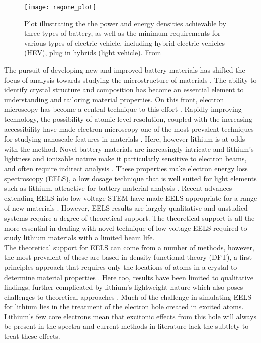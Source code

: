 \begin{figure}
	\centering
	\texttt{[image: ragone\_plot]}
	\caption{Plot illustrating the the power and energy densities achievable by three types of battery, as well as the minimum requirements for various types of electric vehicle, including hybrid electric vehicles (HEV), plug in hybrids (light vehicle). From \cite{etacheri_challenges_2011} }
	\label{ragone}
	
\end{figure}
The pursuit of developing new and improved battery materials has shifted the focus of analysis towards studying the microstructure of materials \cite{lu_lithium_2012,arthur_spontaneous_2016, muller_quantification_2018}. The ability to identify crystal structure and composition has become an essential element to understanding and tailoring material properties.  On this front, electron microscopy has become a central technique to this effort  \cite{chiu_aqueous_2013,inkson_2_2016}.  Rapidly improving technology, the possibility of atomic level resolution, coupled with the increasing accessibility have made electron microscopy one of the most prevalent techniques for studying nanoscale features in materials \cite{hansen_atomic-resolution_2001}.  Here, however lithium is at odds with the method.  Novel battery materials are increasingly intricate and lithium's lightness and ionizable nature make it particularly sensitive to electron beams, and often require indirect analysis \cite{kobayashi_quantitative_2017}.  These properties make electron energy loss spectroscopy (EELS), a low dosage technique that is well suited for light elements such as lithium, attractive for battery material analysis  \cite{Egerton}. Recent advances extending EELS into low voltage STEM have made EELS appropriate for a range of new materials \cite{SU_9000}.  However, EELS results are largely qualitative and unstudied systems require a degree of theoretical support.  The theoretical support is all the more essential in dealing with novel technique of low voltage EELS required to study lithium materials with a limited beam life.    
\\
The theoretical support for EELS can come from a number of methods, however, the most prevalent of these are based in density functional theory (DFT), a first principles approach that requires only the locations of atoms in a crystal to determine material properties \cite{ks_1965, wien2k,elk,exciting}.  Here too, results have been limited to qualitative findings, further complicated by lithium's lightweight nature which also poses challenges to theoretical approaches \cite{mauchamp_ab_2006, mauchamp_local_2008}. Much of the challenge in simulating EELS for lithium lies in the treatment of the electron hole created in excited atoms.  Lithium's few core electrons mean that excitonic effects from this hole will always be present in the spectra and current methods in literature lack the subtlety to treat these effects.

